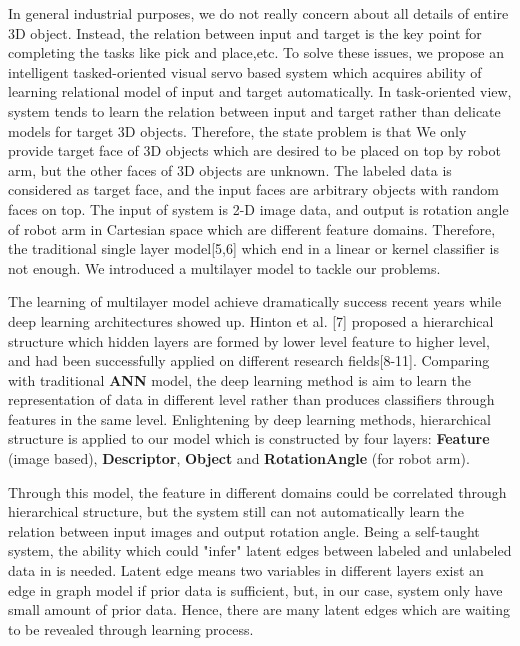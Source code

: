 \documentclass[journal]{IEEEtran}
\begin{document}
In general industrial purposes, we do not really concern about all details of entire 3D object. Instead, the relation between input and target is the key point for completing the tasks like pick and place,etc. To solve these issues, we propose an intelligent tasked-oriented visual servo based system which acquires ability of learning relational model of input and target automatically. In task-oriented view, system tends to learn the relation between input and target rather than delicate models for target 3D objects. Therefore, the state problem is that We only provide target face of 3D objects which are desired to be placed on top by robot arm, but the other faces of 3D objects are unknown. The labeled data is considered as target face, and the input faces are arbitrary objects with random faces on top. The input of system is 2-D image data, and output is rotation angle of robot arm in Cartesian space which are different feature domains. Therefore, the traditional single layer model[5,6] which end in a linear or kernel classifier is not enough. We introduced a multilayer model to tackle our problems. 

The learning of multilayer model achieve dramatically success recent years while deep learning architectures showed up. Hinton et al. [7] proposed a hierarchical structure which hidden layers are formed by lower level feature to higher level, and had been successfully applied on different research fields[8-11]. Comparing with traditional \textbf{ANN} model, the deep learning method is aim to learn the representation of data in different level rather than produces classifiers through features in the same level. Enlightening by deep learning methods, hierarchical structure is applied to our model which is constructed by four layers: \textbf{Feature} (image based), \textbf{Descriptor}, \textbf{Object} and \textbf{RotationAngle} (for robot arm).

Through this model, the feature in different domains could be correlated through hierarchical structure, but the system still can not automatically learn the relation between input images and output rotation angle. Being a self-taught system, the ability which could "infer" latent edges between labeled and unlabeled data in is needed. Latent edge means two variables in different layers exist an edge in graph model if prior data is sufficient, but, in our case, system only have small amount of prior data. Hence, there are many latent edges which are waiting to be revealed through learning process. 
\end{document}
